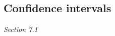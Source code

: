 \documentclass[10pt]{article}
\theoremstyle{definition}
\newcommand{\1}[1]{\textbf{1}_{\left[#1\right]}} %
\def\P{\mathbb{P}} %
\def\Var{\mathrm{Var}} %
\begin{document}


      


\subsection{Confidence intervals}
\textit{Section 7.1}
\end{document}

